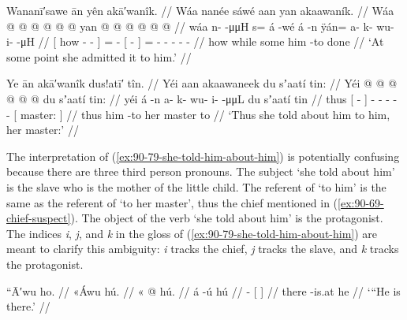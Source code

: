 \ex\label{ex:90-78-she-admitted-it-to-him}%
%
\begingl
	\glpreamble	Wananī′sawe ān yên akā′wanîk. //
	\glpreamble	Wáa nanée sáwé aan yan akaawaník. //
	\gla	{} Wáa  @ {} @ {} @ {} {}
		 @ {} @ {}
		{}  @ {} {}
		yan @  @ {} @ {} @ {} @ {} @ {} //
	\glb	{} wáa n-  -μμH {} {} 
		s= á -wé
		{} á -n {}
		ÿán= a- k- wu- i-  -μH //
	\glc	{}[ how -  - \· {}]
		=  -
		{}[  - {}]
		= - - - -  - //
	\gld	{} how  {} {} \·while {}
		some\·  {}
		{} him -to {}
		done  {} {} {} {} {} //
	\glft	‘At some point she admitted it to him.’
		//
\endgl
\xe

\ex\label{ex:90-79-she-told-him-about-him}%
%
\begingl
	\glpreamble	Ye ān akā′wanîk dus!atī′ tîn. //
	\glpreamble	Yéi aan akaawaneek du sʼaatí tin: //
	\gla	Yéi {}  @ {} {}
		 @ {} @ {} @ {} @ {} @ {}
		{} du sʼaatí tin: {} //
	\glb	yéi {} á -n {}
		a- k- wu- i-  -μμL
		{} du sʼaatí tin {} //
	\glc	thus {}[  - {}]
		- - - -  -
		{}[  master:  {}] //
	\gld	thus {} him -to {}
		 {} {} {} {} {}
		{} her master to {} //
	\glft	‘Thus she told about him to him, her master:’
		//
\endgl
\xe

The interpretation of (\ref{ex:90-79-she-told-him-about-him}) is potentially confusing because there are three third person pronouns.
The subject  ‘she told about him’ is the slave who is the mother of the little child.
The referent of  ‘to him’ is the same as the referent of  ‘to her master’, thus the chief mentioned in (\ref{ex:90-69-chief-suspect}).
The object of the verb  ‘she told about him’ is the protagonist.
The indices \textit{i}, \textit{j}, and \textit{k} in the gloss of (\ref{ex:90-79-she-told-him-about-him}) are meant to clarify this ambiguity: \textit{i} tracks the chief, \textit{j} tracks the slave, and \textit{k} tracks the protagonist.

\ex\label{ex:90-80-hes-there}%
%
\begingl
	\glpreamble	“Ā′wu ho. //
	\glpreamble	«\!Áwu hú. //
	\gla	«\! @ {} {} hú. {} //
	\glb	\pqp{}á -ú {} hú {} //
	\glc	\pqp{} - {}[  {}] //
	\gld	\pqp{}there -is.at {} he {} //
	\glft	‘“He is there.’
		//
\endgl
\xe

